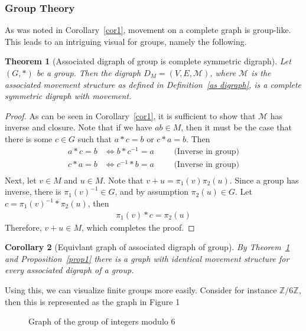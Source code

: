 \documentclass[a4paper,11pt]{article}
\theoremstyle{plain}
\newtheorem{theorem}{Theorem}
\newtheorem{corollary}[theorem]{Corollary}
\theoremstyle{definition}
\newcommand{\Z}{\mathbb{Z}}
\newcommand{\iff}{\Longleftrightarrow}
\begin{document}
\subsubsection{Group Theory}
As was noted in Corollary~\ref{cor1}, movement on a complete graph is
group-like. This leads to an intriguing visual for groups, namely the
following.
\begin{theorem}[Associated digraph of group is 
	complete symmetric digraph]\label{the2}
	Let $(G,*)$ be a group. Then the digraph $D_M=(V,E,\mathcal{M})$,
	where $\mathcal{M}$ is the associated movement structure as
	defined in Definition~\ref{as digraph}, is a complete symmetric
	digraph with movement.
\end{theorem}
\begin{proof}
	As can be seen in Corollary~\ref{cor1}, it is sufficient to show that
	$\mathcal{M}$ has inverse and closure. Note that if we have $ab\in M$, then
	it must be the case that there is some $c\in G$ such that $a*c=b$ or
	$c*a=b$. Then
	\begin{equation}
	\begin{aligned}
		a*c=b &\iff b*c^{-1}=a &&&\text{(Inverse in group)}\\
		c*a=b &\iff c^{-1}*b=a &&&\text{(Inverse in group)}\\
	\end{aligned}
	\end{equation}
	Next, let $v\in M$ and $u\in M$. Note that $v+u=\pi_1(v)\pi_2(u)$. Since a
	group has inverse, there is ${\pi_1(v)}^{-1} \in G$, and by assumption
	$\pi_2(u)\in G$. Let $c={\pi_1(v)}^{-1}*\pi_2(u)$, then
	\begin{equation}
	\begin{aligned}
		\pi_1(v)*c=\pi_2(u)
	\end{aligned}
	\end{equation}
	Therefore, $v+u\in M$, which completes the proof.
\end{proof}
\begin{corollary}[Equivlant graph of associated digraph of group]
	By Theorem~\ref{the2} and Proposition~\ref{prop1} there is a graph with
	identical movement structure for every associated digraph of a group.
\end{corollary}
Using this, we can visualize finite groups more easily. Consider for instance
$\Z/6\Z$, then this is represented as the graph in Figure 1

\begin{figure}[h]\label{fig:ZmodN}
	\centering
	\caption{Graph of the group of integers modulo 6}
\end{figure}
\end{document}
